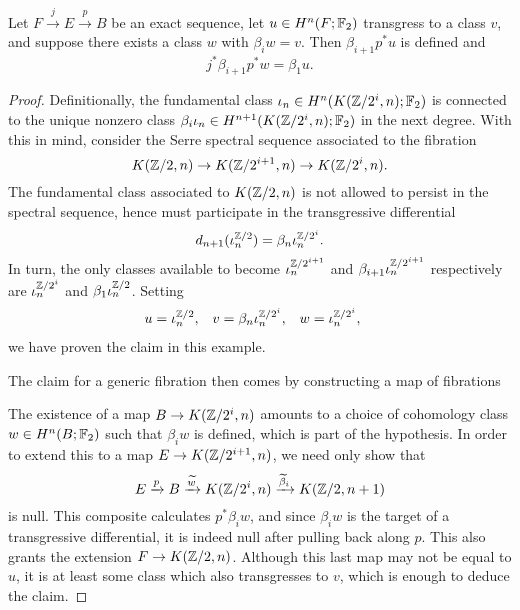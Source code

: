 \begin{theorem}\label{BocksteinLemma}%
Let $F \xrightarrow j E \xrightarrow p B$ be an exact sequence, let $u \in H^n(F; \mathbb F_2)$ transgress to a class $v$, and suppose there exists a class $w$ with $\beta_i w = v$.  Then $\beta_{i+1} p^* u$ is defined and \[j^* \beta_{i+1} p^* w = \beta_1 u.\]
\end{theorem}
\begin{proof}
Definitionally, the fundamental class $\iota_n \in H^n(K(\mathbb Z/2^i, n); \mathbb F_2)$ is connected to the unique nonzero class $\beta_i \iota_n \in H^{n+1}(K(\mathbb Z/2^i, n); \mathbb F_2)$ in the next degree.
With this in mind, consider the Serre spectral sequence associated to the fibration \[K(\mathbb Z/2, n) \to K(\mathbb Z/2^{i+1}, n) \to K(\mathbb Z/2^i, n).\]
The fundamental class associated to $K(\mathbb Z/2, n)$ is not allowed to persist in the spectral sequence, hence must participate in the transgressive differential \[d_{n+1}(\iota_n^{\mathbb Z/2}) = \beta_n \iota_n^{\mathbb Z/2^i}.\]
In turn, the only classes available to become $\iota_n^{\mathbb Z/2^{i+1}}$ and $\beta_{i+1} \iota_n^{\mathbb Z/2^{i+1}}$ respectively are $\iota_n^{\mathbb Z/2^i}$ and $\beta_1 \iota_n^{\mathbb Z/2}$.
Setting
\begin{align*}
u & = \iota_n^{\mathbb Z/2}, &
v & = \beta_n \iota_n^{\mathbb Z/2^i}, &
w & = \iota_n^{\mathbb Z/2^i},
\end{align*}
we have proven the claim in this example.

The claim for a generic fibration then comes by constructing a map of fibrations
\begin{center}
\end{center}
The existence of a map $B \to K(\mathbb Z/2^i, n)$ amounts to a choice of cohomology class $w \in H^n(B; \mathbb F_2)$ such that $\beta_i w$ is defined, which is part of the hypothesis.
In order to extend this to a map $E \to K(\mathbb Z/2^{i+1}, n)$, we need only show that \[E \xrightarrow p B \xrightarrow{\widetilde w} K(\mathbb Z/2^i, n) \xrightarrow{\widetilde \beta_i} K(\mathbb Z/2, n+1)\] is null.
This composite calculates $p^* \beta_i w$, and since $\beta_i w$ is the target of a transgressive differential, it is indeed null after pulling back along $p$.
This also grants the extension $F \to K(\mathbb Z/2, n)$.
Although this last map may not be equal to $u$, it is at least some class which also transgresses to $v$, which is enough to deduce the claim.
\end{proof}

